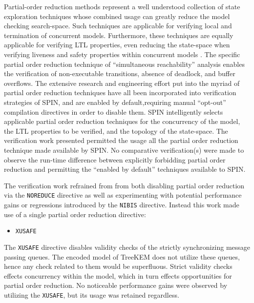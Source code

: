 Partial-order reduction methods represent a well understood collection of state exploration techniques \autocite{godefroid1990using, godefroid1991using, godefroid1994partial, holzmann1995improvement, katz1992verification, peled1993all, valmari1989stubborn, valmari1991stubborn} whose combined usage can greatly reduce the model checking search-space.
Such techniques are applicable for verifying local and termination of concurrent models.
Furthermore, these techniques are equally applicable for verifying LTL properties, even reducing the state-space when verifying liveness and safety properties within concurrent models \autocite{wolper1983reasoning}.
The specific partial order reduction technique of ``simultaneous reachability'' analysis \autocite{van1997partial} enables the verification of non-executable transitions, absence of deadlock, and buffer overflows.
The extensive research and engineering effort put into the myriad of partial order reduction techniques have all been incorporated into verification strategies of SPIN, and are enabled by default,requiring manual ``opt-out'' compilation directives in order to disable them.
SPIN intelligently selects applicable partial order reduction techniques for the concurrency of the model, the LTL properties to be verified, and the topology of the state-space.
The verification work presented permitted the usage all the partial order reduction technique made available by SPIN.\@
No comparative verification(s) were made to observe the run-time difference between explicitly forbidding partial order reduction and permitting the ``enabled by default'' techniques available to SPIN.\@

The verification work refrained from from both disabling partial order reduction via the \texttt{NOREDUCE} directive as well as experimenting with potential performance gains or regressions introduced by the \texttt{NIBIS} directive.
Instead this work made use of a single partial order reduction directive:

\begin{itemize}
\item \texttt{XUSAFE}
\end{itemize}

The \texttt{XUSAFE} directive disables validity checks of the strictly synchronizing message passing queues.
The encoded model of TreeKEM does not utilize these queues, hence any check related to them would be superfluous.
Strict validity checks effects concurrency within the model, which in turn effects opportunities for partial order reduction.
No noticeable performance gains were observed by utilizing the \texttt{XUSAFE}, but its usage was retained regardless.


